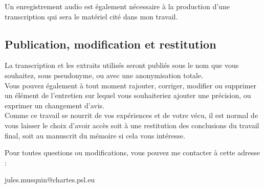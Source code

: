     Un enregistrement audio est également nécessaire à la production d'une transcription qui sera le matériel cité dans mon travail.

    \subsection*{Publication, modification et restitution}

    La transcription et les extraits utilisés seront publiés sous le nom que vous souhaitez, sous pseudonyme, ou avec une anonymisation totale.\\

    Vous pouvez également à tout moment rajouter, corriger, modifier ou supprimer un élément de l'entretien sur lequel vous souhaiteriez ajouter une précision, ou exprimer un changement d'avis.\\

    Comme ce travail se nourrit de vos expériences et de votre vécu, il est normal de vous laisser le choix d'avoir accès soit à une restitution des conclusions du travail final, soit au manuscrit du mémoire si cela vous intéresse.\\
    \vspace{0.5cm}
    
    Pour toutes questions ou modifications, vous pouvez me contacter à cette adresse :
    \vspace{0.1cm}
    
    jules.musquin@chartes.psl.eu